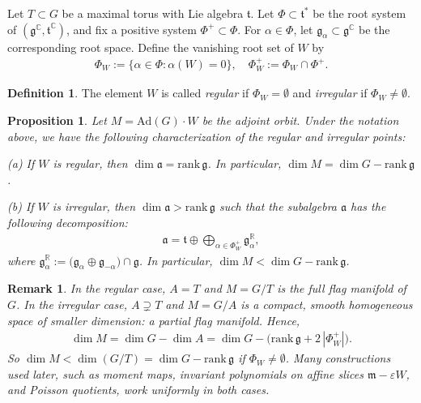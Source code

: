 \documentclass[11pt]{amsart}
\newtheorem{proposition}[theorem]{Proposition}
\theoremstyle{definition}
\newtheorem{definition}[theorem]{Definition}
\theoremstyle{plain}
\newtheorem{remark}[theorem]{Remark}
\theoremstyle{conclusion}
\begin{document}
Let $T\subset G$ be a maximal torus with Lie algebra $\mathfrak{t}$. %
Let $\Phi\subset\mathfrak{t}^*$ be the root system of $(\mathfrak{g}^{\mathbb{C}},\mathfrak{t}^{\mathbb{C}})$, and fix a positive system $\Phi^+\subset\Phi$. For $\alpha\in\Phi$, let $\mathfrak{g}_{\alpha}\subset\mathfrak{g}^{\mathbb{C}}$ be the corresponding root space. Define the vanishing root set of $W$ by \begin{align}
\Phi_W:=\{\alpha\in\Phi: \alpha(W)=0\},\quad \Phi_W^+:=\Phi_W\cap\Phi^+.
\end{align}

\begin{definition} 
\label{def:regularirr}
The element $W$ is called \textit{regular} if $\Phi_W=\emptyset$ and \textit{irregular} if $\Phi_W\neq\emptyset$. 
\end{definition}

\begin{proposition} 
\label{prop:characterizationirrarr}
Let $M=\mathrm{Ad}(G)\cdot W$ be the adjoint orbit. Under the notation above, we have the following characterization of the regular and irregular points: 

(a) If $W  $ is regular, then $\dim\mathfrak{a}=\mathrm{rank}\, \mathfrak{g}$. In particular,   $\dim M=\dim G-\mathrm{rank}\, \mathfrak{g}$.  

(b) If $W$ is irregular,  then $\dim\mathfrak{a}>\mathrm{rank}\, \mathfrak{g}$ such that the subalgebra $\mathfrak{a}$ has the following decomposition: \begin{align*}
\mathfrak{a} = \mathfrak{t} \oplus  \bigoplus_{\alpha\in\Phi_W^+}\mathfrak{g}_{\alpha}^{\mathbb{R}},
\end{align*} where $ \mathfrak{g}_{\alpha}^{\mathbb{R}}:=\big(\mathfrak{g}_{\alpha}\oplus\mathfrak{g}_{-\alpha}\big)\cap\mathfrak{g} $. In particular, $\dim M<\dim G-\mathrm{rank}\, \mathfrak{g}$.  
\end{proposition}
\begin{remark} 
\label{rmk:consequences}
In the regular case, $A=T$ and $M=G/T$ is the full flag manifold of $G$. In the irregular case, $A\supsetneq T$ and $M=G/A$ is a compact, smooth homogeneous space of smaller dimension: a partial flag manifold. Hence, \begin{align*}
\dim M=\dim G-\dim A =\dim G-\big(\mathrm{rank}\, \mathfrak{g}+2\,\left|\Phi_W^+\right|\big).
\end{align*}
So $\dim M<\dim(G/T)=\dim G -\mathrm{rank}\, \mathfrak{g}$ if $\Phi_W\neq\emptyset$. Many constructions used later, such as moment maps, invariant polynomials on affine slices $\mathfrak{m}-\varepsilon W$, and Poisson quotients, work uniformly in both cases. %
\end{remark}
\end{document}
